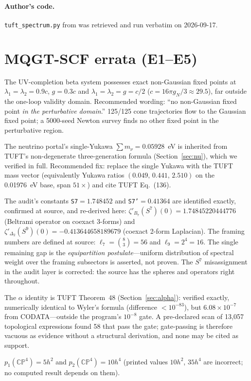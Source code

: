 \documentclass[11pt,letterpaper]{article}
\newcommand{\zetaP}{\zeta'}
\newcommand{\Sp}[1]{S^{#1}}
\begin{document}
\paragraph{Author's code.} \texttt{tuft\_spectrum.py} from
\cite{nielsenrepo} was retrieved and run verbatim on 2026-09-17.

\section{MQGT-SCF errata (E1--E5)}
\label{sec:mqgt}

\begin{description}[leftmargin=1.6em,style=nextline]
\item[E1 (wording).] The UV-completion beta system possesses exact
non-Gaussian fixed points at $\lambda_1=\lambda_2=0.9c$, $g=0.3c$ and
$\lambda_1=\lambda_2=g=c/2$ ($c=16\pi g_N/3\approx 29.5$), far outside the
one-loop validity domain. Recommended wording: ``no non-Gaussian fixed point
\emph{in the perturbative domain}.'' 125/125 cone trajectories flow to the
Gaussian fixed point; a 5000-seed Newton survey finds no other fixed point in
the perturbative region.

\item[E2 (resolved at source).] The neutrino portal's single-Yukawa
$\sum m_\nu = 0.05928$~eV is inherited from TUFT's non-degenerate
three-generation formula (Section~\ref{sec:nu}), which we verified in full.
Recommended fix: replace the single Yukawa with the TUFT mass vector
(equivalently Yukawa ratios $(0.049,\,0.441,\,2.510)$ on the 0.01976~eV base,
span $51\times$) and cite TUFT Eq.~(136).

\item[E3 (closed end-to-end).] The audit's constants \texttt{S7}$=1.748452$
and \texttt{S7'}$=0.41364$ are identified exactly, confirmed at source, and
re-derived here: $\zetaP_{B_7}(\Sp{7})(0)=1.74845220444776$ (Beltrami operator
on coexact 3-forms) and $\zetaP_{\Delta_2}(\Sp{9})(0)=-0.413644658189679$
(coexact 2-form Laplacian). The framing numbers are defined at source:
$\ell_7=\binom{8}{3}=56$ and $\ell_9=2^{4}=16$. The single remaining gap is
the \emph{equipartition postulate}---uniform distribution of spectral weight
over the framing subsectors is asserted, not proven. The $\Sp{7}$
misassignment in the audit layer is corrected: the source has the spheres and
operators right throughout.

\item[E4 (gate verdict stands; provenance strengthened).] The $\alpha$
identity is TUFT Theorem~48 (Section~\ref{sec:alpha}): verified exactly,
numerically identical to Wyler's formula (difference $<10^{-83}$), but
$6.08\times10^{-7}$ from CODATA---outside the program's $10^{-8}$ gate. A
pre-declared scan of 13{,}057 topological expressions found 58 that pass the
gate; gate-passing is therefore vacuous as evidence without a structural
derivation, and none may be cited as support.

\item[E5 (documentation).] $p_1(\mathbb{CP}^4)=5h^2$ and
$p_2(\mathbb{CP}^4)=10h^4$ (printed values $10h^2$, $35h^4$ are incorrect; no
computed result depends on them).
\end{description}
\end{document}
